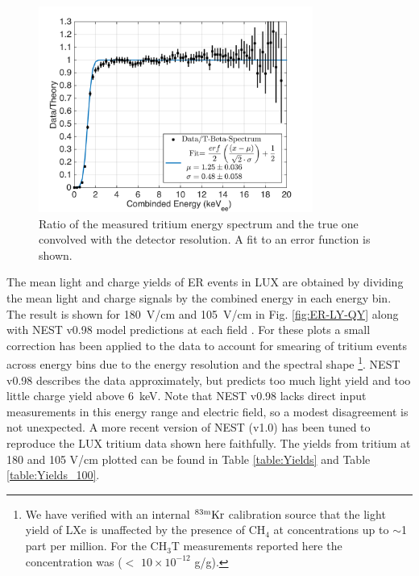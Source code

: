 \begin{figure}[h!]
\includegraphics[width=90mm]{fig/E_Thres_Fit.png}
\caption{Ratio of the measured tritium energy spectrum and the true one convolved with the detector resolution. A fit to an error function is shown.}
\label{fig:ER-threshold}
\end{figure}




The mean light and charge yields of ER events in LUX are obtained by dividing the mean light and charge signals by the combined energy in each energy bin. The result is shown for 180~V/cm and 105~V/cm in Fig. \ref{fig:ER-LY-QY} along with NEST v0.98 model predictions at each field \cite{NEST_2013}. For these plots a small correction has been applied to the data to account for smearing of tritium events across energy bins due to the energy resolution and the spectral shape \cite{Dobi_Thesis}\footnote{We have verified with an internal $\rm ^{83m}Kr$ calibration source that the light yield of LXe is unaffected by the presence of CH$_4$ at concentrations up to $\sim$1 part per million. For the CH$_3$T measurements reported here the concentration was ($<$ $10\times10^{-12}$ g/g). }.  NEST v0.98 describes the data approximately, but predicts too much light yield and too little charge yield above 6~keV. Note that NEST v0.98 lacks direct input measurements in this energy range and electric field, so a modest disagreement is not unexpected. A more recent version of NEST (v1.0) has been tuned to reproduce the LUX tritium data shown here faithfully. The yields from tritium at 180 and 105 V/cm plotted can be found in Table \ref{table:Yields} and Table \ref{table:Yields_100}.

